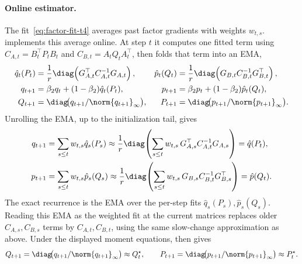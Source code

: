 \paragraph{Online estimator.} The fit~\eqref{eq:factor-fit-t4} averages past
factor gradients with weights $w_{t,s}$. \methodname{} implements this
average online. At step $t$ it computes one fitted term using
$C_{A,t}=B_t^\top P_tB_t$ and $C_{B,t}=A_tQ_tA_t^\top$, then folds that term
into an EMA,
\begin{equation}\label{eq:ours-klcoupling-t4}
\begin{aligned}
  \hat{q}_t(P_t) &= \frac1r\diag\!\left(G_{A,t}^\top C_{A,t}^{-1}G_{A,t}\right),
  &
  \hat{p}_t(Q_t) &= \frac1r\diag\!\left(G_{B,t} C_{B,t}^{-1}G_{B,t}^\top\right),
  \\
  q_{t+1} &= \beta_2q_t+(1-\beta_2)\hat{q}_t(P_t),
  &
  p_{t+1} &= \beta_2p_t+(1-\beta_2)\hat{p}_t(Q_t),
  \\
  Q_{t+1} &= \diag\!\bigl(q_{t+1}/\norm{q_{t+1}}_\infty\bigr),
  &
  P_{t+1} &= \diag\!\bigl(p_{t+1}/\norm{p_{t+1}}_\infty\bigr).
\end{aligned}
\end{equation}
Unrolling the EMA, up to the initialization tail, gives
\[
\begin{aligned}
  q_{t+1}
  &=
  \sum_{s\le t}w_{t,s}\hat q_s(P_s)
  \approx
  \frac1r\diag\!\left(
    \sum_{s\le t}w_{t,s}\,G_{A,s}^\top C_{A,t}^{-1}G_{A,s}
  \right)
  =
  \hat q(P_t),\\
  p_{t+1}
  &=
  \sum_{s\le t}w_{t,s}\hat p_s(Q_s)
  \approx
  \frac1r\diag\!\left(
    \sum_{s\le t}w_{t,s}\,G_{B,s}C_{B,t}^{-1}G_{B,s}^\top
  \right)
  =
  \hat p(Q_t).
\end{aligned}
\]
The exact recurrence is the EMA over the per-step fits
$\hat q_s(P_s),\hat p_s(Q_s)$. Reading this EMA as the weighted fit at the
current matrices replaces older $C_{A,s},C_{B,s}$ terms by
$C_{A,t},C_{B,t}$, using the same slow-change approximation as above. Under
the displayed moment equations,  then gives
\[
  Q_{t+1}
  =
  \diag\!\bigl(q_{t+1}/\norm{q_{t+1}}_\infty\bigr)
  \approx Q^\star_t,
  \qquad
  P_{t+1}
  =
  \diag\!\bigl(p_{t+1}/\norm{p_{t+1}}_\infty\bigr)
  \approx P^\star_t .
\]

